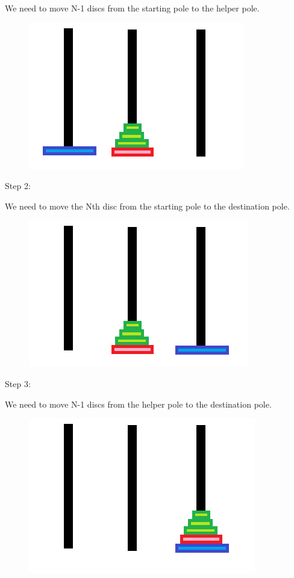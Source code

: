 \documentclass[11pt,oneside]{book}
\makeatletter
\def\maxwidth#1{\ifdim\Gin@nat@width>#1 #1\else\Gin@nat@width\fi}
\makeatother
\begin{document}
We need to move N-1 discs from the starting pole to the helper pole.
\vspace{5px}\begin{figure}[H]\centering
        \includegraphics[width=0.66\maxwidth{\textwidth}]{hanoi2.png}
        \end{figure}

Step 2:

We need to move the Nth disc from the starting pole to the destination pole.
\vspace{5px}\begin{figure}[H]\centering
        \includegraphics[width=0.66\maxwidth{\textwidth}]{hanoi3.png}
        \end{figure}

Step 3:

We need to move N-1 discs from the helper pole to the destination pole.
\vspace{5px}\begin{figure}[H]\centering
        \includegraphics[width=0.66\maxwidth{\textwidth}]{hanoi4.png}
        \end{figure}
\end{document}
